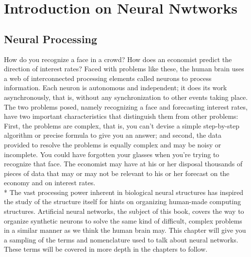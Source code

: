 \documentclass{wileysev}
\begin{document}



\titlepage

\chapter{Introduction on Neural Nwtworks}

\section{Neural Processing}
How do you recognize a face in a crowd? How does an economist predict the
direction of interest rates? Faced with problems like these, the human brain
uses a web of interconnected processing elements called neurons to process
information. Each neuron is autonomous and independent; it does its work
asynchronously, that is, without any synchronization to other events taking
place. The two problems posed, namely recognizing a face and forecasting
interest rates, have two important characteristics that distinguish them from
other problems: First, the problems are complex, that is, you can’t devise a
simple step-by-step algorithm or precise formula to give you an answer; and
second, the data provided to resolve the problems is equally complex and may
be noisy or incomplete. You could have forgotten your glasses when you’re
trying to recognize that face. The economist may have at his or her disposal
thousands of pieces of data that may or may not be relevant to his or her
forecast on the economy and on interest rates. \\*
The vast processing power inherent in biological neural structures has inspired
the study of the structure itself for hints on organizing human-made computing
structures. Artificial neural networks, the subject of this book, covers the way
to organize synthetic neurons to solve the same kind of difficult, complex
problems in a similar manner as we think the human brain may. This chapter
will give you a sampling of the terms and nomenclature used to talk about
neural networks. These terms will be covered in more depth in the chapters to
follow.
\end{document}
